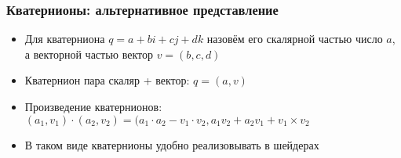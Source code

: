 \documentclass{beamer}
\begin{document}
\begin{frame}[fragile]
\frametitle{Кватернионы: альтернативное представление}
\begin{itemize}
\item Для кватерниона \begin{math}q = a + bi + cj + dk\end{math} назовём его скалярной частью число \begin{math}a\end{math}, а векторной частью \textendash{} вектор \begin{math}v = (b, c, d)\end{math}
\item Кватернион \textendash{} пара скаляр + вектор: \begin{math}q = (a, v)\end{math}
\pause
\item Произведение кватернионов: \begin{math}(a_1, v_1) \cdot (a_2, v_2) = (a_1 \cdot a_2 - v_1 \cdot v_2, a_1 v_2 + a_2 v_1 + v_1 \times v_2\end{math}
\pause
\item В таком виде кватернионы удобно реализовывать в шейдерах
\end{itemize}
\end{frame}
\end{document}
